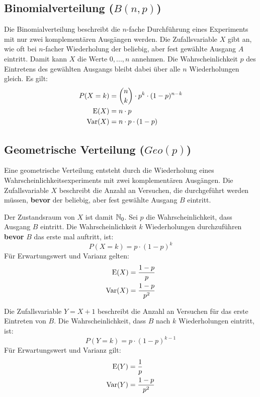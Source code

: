 \subsection{Binomialverteilung ($B(n,p)$)}

Die Binomialverteilung beschreibt die $n$-fache Durchführung eines Experiments
mit nur zwei komplementären Ausgängen werden. Die Zufallsvariable $X$ gibt an,
wie oft bei $n$-facher Wiederholung der beliebig, aber fest gewählte Ausgang $A$
eintritt. Damit kann $X$ die Werte $0, ..., n$ annehmen. Die Wahrscheinlichkeit
$p$ des Eintretens des gewählten Ausgangs bleibt dabei über alle $n$
Wiederholungen gleich. Es gilt:
\begin{align*}
P(X=k) &= \binom{n}{k}\cdot p^k\cdot(1-p)^{n-k} \\
\operatorname{E}(X) &= n \cdot p \\
\operatorname{Var}(X) &= n \cdot p \cdot (1-p) \\
\end{align*}

\subsection{Geometrische Verteilung ($Geo(p)$)}

Eine geometrische Verteilung entsteht durch die Wiederholung eines
Wahrscheinlichkeitsexperiments mit zwei komplementären Ausgängen. Die
Zufallsvariable $X$ beschreibt die Anzahl an Versuchen, die durchgeführt werden
müssen, \textbf{bevor} der beliebig, aber fest gewählte Ausgang $B$ eintritt.

Der Zustandsraum von $X$ ist damit $\mathbb{N}_0$. Sei $p$ die Wahrscheinlichkeit, dass Ausgang $B$ eintritt. 
Die Wahrscheinlichkeit $k$ Wiederholungen durchzuführen \textbf{bevor} $B$ das erste mal auftritt, ist:
\[
P(X=k) = p \cdot (1-p)^k
\]
Für Erwartungswert und Varianz gelten:
\begin{align*}
\operatorname{E}(X) &= \frac{1-p}{p} \\
\operatorname{Var}(X) &= \frac{1-p}{p^2}
\end{align*}


Die Zufallsvariable $Y = X+1$ beschreibt die Anzahl an Versuchen für das erste Eintreten von $B$.
Die Wahrscheinlichkeit, dass $B$ nach $k$ Wiederholungen eintritt, ist:
\[
P(Y=k) = p \cdot (1-p)^{k-1}
\]
Für Erwartungswert und Varianz gilt:
\begin{align*}
\operatorname{E}(Y) &= \frac{1}{p} \\
\operatorname{Var}(Y) &= \frac{1-p}{p^2}
\end{align*}


